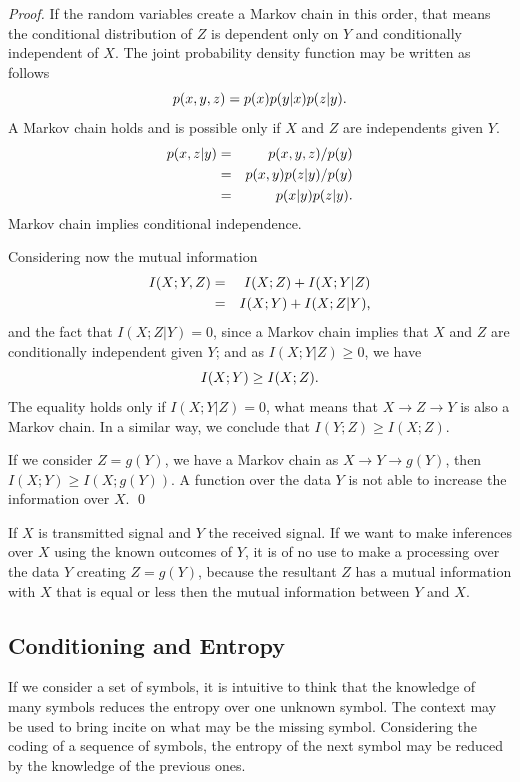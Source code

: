 \begin{proof}
If the random variables create a Markov chain in this order, that means the conditional 
distribution of $Z$ is dependent only on $Y$ and conditionally independent of $X$. 
The joint probability density function may be written as follows
\begin{equation}
p(x,y,z) = p(x)p(y|x)p(z|y) \textmd{.}
\end{equation}
A Markov chain holds and is possible only if $X$ and $Z$ are independents given $Y$.
\begin{eqnarray}
p(x,z|y) &=& p(x,y,z) / p(y) \nonumber \\
&=& p(x,y)p(z|y) / p(y) \nonumber \\
&=& p(x|y)p(z|y) \textmd{.}
\end{eqnarray}
Markov chain implies conditional independence.

Considering now the mutual information
\begin{eqnarray}
I(X;Y,Z) &=& I(X;Z) + I(X;Y|Z) \nonumber \\
&=& I(X;Y) + I(X;Z|Y) \textmd{,}
\end{eqnarray}
and the fact that $I(X;Z|Y) = 0$, since a Markov chain implies that $X$ and $Z$ are conditionally 
independent given $Y$; and as $I(X;Y|Z) \geq 0$, we have
\begin{equation}
I(X;Y) \geq I(X;Z) \textmd{.}
\end{equation}
The equality holds only if $I(X;Y|Z) = 0$, what means that $X \rightarrow Z \rightarrow Y$ is also a Markov chain.
In a similar way, we conclude that $I(Y;Z) \geq I(X;Z)$.

If we consider $Z = g(Y)$, we have a Markov chain as $X \rightarrow Y \rightarrow g(Y)$, then $I(X;Y) \geq I(X;g(Y))$. 
A function over the data $Y$ is not able to increase the information over $X$. \qed
\end{proof}
\begin{remark}
If $X$ is transmitted signal and $Y$ the received signal. If we want to make inferences over $X$ 
using the known outcomes of $Y$, it is of no use to make a processing over the data $Y$ creating $Z=g(Y)$, 
because the resultant $Z$ has a mutual information with $X$ that is equal or less then the mutual information 
between $Y$ and $X$.
\end{remark}



\subsection{Conditioning and Entropy}
If we consider a set of symbols, it is intuitive to think that the knowledge of many symbols reduces the entropy 
over one unknown symbol. The context may be used to bring incite on what may be the missing symbol. 
Considering the coding of a sequence of symbols, the entropy of the next symbol may be reduced by the knowledge of the previous ones.

